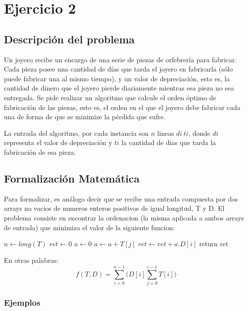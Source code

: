 \section{Ejercicio 2}
\newtheorem{Teo}{Teorema}

\subsection{Descripci\'on del problema}

Un joyero recibe un encargo de una serie de piezas de orfebrer\'ia para fabricar. Cada pieza posee una cantidad de d\'ias que tarda el joyero en fabricarla (s\'olo puede fabricar una al mismo tiempo), y un valor de depreciaci\'on, esto es, la cantidad de dinero que el joyero pierde diariamente mientras esa pieza no sea entregada. Se pide realizar un algoritmo que calcule el orden \'optimo de fabricaci\'on de las piezas, esto es, el orden en el que el joyero debe fabricar cada una de forma de que se minimize la p\'erdida que sufre. 

\vspace{2mm}

La entrada del algoritmo, por cada instancia son $n$ lineas $di \: ti$, donde $di$ representa el valor de depreciaci\'on y $ti$ la cantidad de dias que tarda la fabricaci\'on de esa pieza.

\subsection{Formalizaci\'on Matem\'atica}

Para formalizar, es an\'alogo decir que se recibe una entrada compuesta por dos arrays no vacios de numeros enteros positivos de igual longitud, T y D. El problema consiste en encontrar la ordenacion (la misma aplicada a ambos arrays de entrada) que minimiza el valor de la siguiente funcion:\\
\begin{algorithmic}
\Loop
	\State $n \leftarrow long(T)$
	\State $ret \leftarrow 0$
		\State $a \leftarrow 0$
			\State $a \leftarrow a + T[j]$
		\EndFor
		\State $ret \leftarrow ret + a.D[i]$
	\EndFor
	\State return ret
\EndLoop
\end{algorithmic}

En otras palabras: $$ f(T,D) = \sum_{i=0}^{n-1} \bigg (D[i] \sum_{j=0}^{i-1} T[i] \bigg) $$

\subsubsection{Ejemplos}


